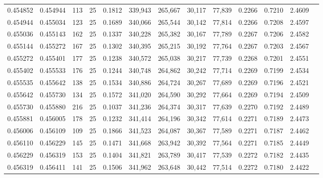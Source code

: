 \begin{tabular}{rrrrrrrrrrrrr}
0.454852 & 0.454944 &   113 &  25 &                                     0.1812 & 339,943 & 265,667 &  30,117 &  77,839 & 0.2266 & 0.7210 & 2.4609 \\
0.454944 & 0.455034 &   123 &  25 &                                     0.1689 & 340,066 & 265,544 &  30,142 &  77,814 & 0.2266 & 0.7208 & 2.4597 \\
0.455036 & 0.455143 &   162 &  25 &                                     0.1337 & 340,228 & 265,382 &  30,167 &  77,789 & 0.2267 & 0.7206 & 2.4582 \\
0.455144 & 0.455272 &   167 &  25 &                                     0.1302 & 340,395 & 265,215 &  30,192 &  77,764 & 0.2267 & 0.7203 & 2.4567 \\
0.455272 & 0.455401 &   177 &  25 &                                     0.1238 & 340,572 & 265,038 &  30,217 &  77,739 & 0.2268 & 0.7201 & 2.4551 \\
0.455402 & 0.455533 &   176 &  25 &                                     0.1244 & 340,748 & 264,862 &  30,242 &  77,714 & 0.2269 & 0.7199 & 2.4534 \\
0.455535 & 0.455642 &   138 &  25 &                                     0.1534 & 340,886 & 264,724 &  30,267 &  77,689 & 0.2269 & 0.7196 & 2.4521 \\
0.455642 & 0.455730 &   134 &  25 &                                     0.1572 & 341,020 & 264,590 &  30,292 &  77,664 & 0.2269 & 0.7194 & 2.4509 \\
0.455730 & 0.455880 &   216 &  25 &                                     0.1037 & 341,236 & 264,374 &  30,317 &  77,639 & 0.2270 & 0.7192 & 2.4489 \\
0.455881 & 0.456005 &   178 &  25 &                                     0.1232 & 341,414 & 264,196 &  30,342 &  77,614 & 0.2271 & 0.7189 & 2.4473 \\
0.456006 & 0.456109 &   109 &  25 &                                     0.1866 & 341,523 & 264,087 &  30,367 &  77,589 & 0.2271 & 0.7187 & 2.4462 \\
0.456110 & 0.456229 &   145 &  25 &                                     0.1471 & 341,668 & 263,942 &  30,392 &  77,564 & 0.2271 & 0.7185 & 2.4449 \\
0.456229 & 0.456319 &   153 &  25 &                                     0.1404 & 341,821 & 263,789 &  30,417 &  77,539 & 0.2272 & 0.7182 & 2.4435 \\
0.456319 & 0.456411 &   141 &  25 &                                     0.1506 & 341,962 & 263,648 &  30,442 &  77,514 & 0.2272 & 0.7180 & 2.4422 \\

\end{tabular}
